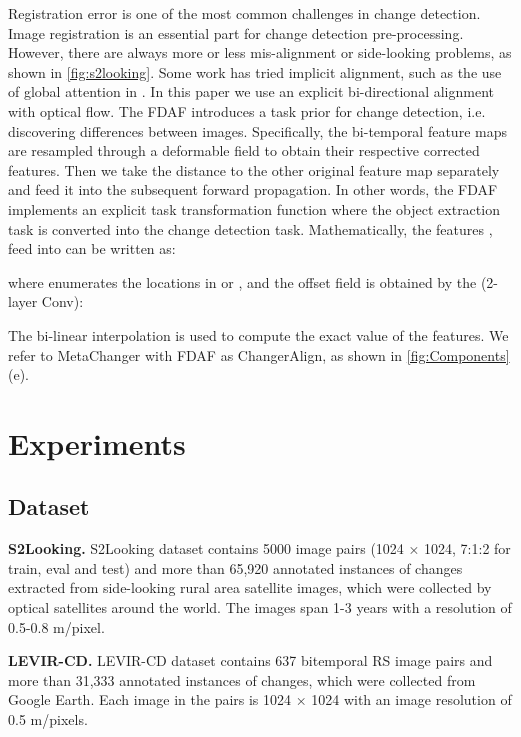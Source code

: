 \documentclass[10pt,twocolumn,letterpaper]{article}
\begin{document}
Registration error is one of the most common challenges in change detection. Image registration is an essential part for change detection pre-processing. However, there are always more or less mis-alignment or side-looking problems, as shown in \cref{fig:s2looking}. Some work has tried implicit alignment, such as the use of global attention in \cite{chen2020spatial}. In this paper we use an explicit bi-directional alignment with optical flow. The FDAF introduces a task prior for change detection, i.e. discovering differences between images. Specifically, the bi-temporal feature maps are resampled through a deformable field to obtain their respective corrected features. Then we take the distance to the other original feature map separately and feed it into the subsequent forward propagation. In other words, the FDAF implements an explicit task transformation function where the object extraction task is converted into the change detection task. Mathematically, the features ,  feed into  can be written as:

where  enumerates the locations in  or , and the offset field  is obtained by the  (2-layer Conv):

The bi-linear interpolation \cite{jaderberg2015spatial} is used to compute the exact value of the features. We refer to MetaChanger with FDAF as ChangerAlign, as shown in \cref{fig:Components}(e).





\section{Experiments}

\subsection{Dataset}
\textbf{S2Looking.} S2Looking dataset \cite{shen2021s2looking} contains 5000 image pairs (1024 × 1024, 7:1:2 for train, eval and test) and more than 65,920 annotated instances of changes extracted from side-looking rural area satellite images, which were collected by optical satellites around the world. The images span 1-3 years with a resolution of 0.5-0.8 m/pixel.

\textbf{LEVIR-CD.} LEVIR-CD dataset \cite{chen2020spatial} contains 637 bitemporal RS image pairs and more than 31,333 annotated instances of changes, which were collected from Google Earth. Each image in the pairs is 1024 × 1024 with an image resolution of 0.5 m/pixels.
\end{document}
